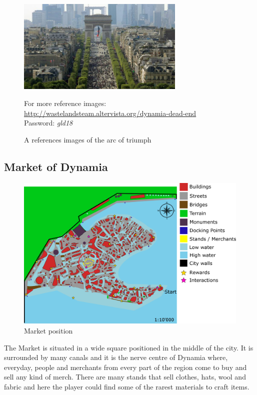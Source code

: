 \begin{figure}[H]
    \centering
    \includegraphics[width=8cm]{Images/Landmarks/arcOfTriumph}
    \caption{A references images of the arc of triumph}
    For more reference images: \href{http://wastelandsteam.altervista.org/dynamia-dead-end}{http://wastelandsteam.altervista.org/dynamia-dead-end}\\Password: \textit{gld18}
  \end{figure}

\subsection{Market of Dynamia}
\begin{figure}[H]
  \centering
  \includegraphics[width=12cm]{Images/Maps/dynamia_market}
  \caption{Market position}
\end{figure}

The Market is situated in a wide square positioned in the middle of the city. It is surrounded by many canals and it is the nerve centre of Dynamia where, everyday, people and merchants from every part of the region come to buy and sell any kind of merch. There are many stands that sell clothes, hats, wool and fabric and here the player could find some of the rarest materials to craft items.

